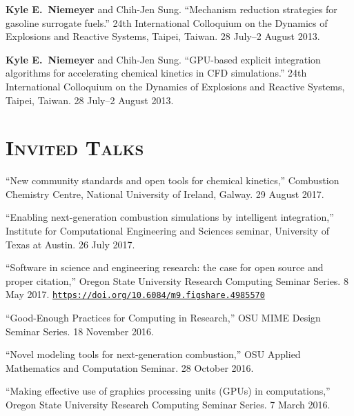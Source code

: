\documentclass[margin,line,11pt]{res}
\makeatletter
\newlength{\bibhang}
\newlength{\bibsep}
 {\@listi \global\bibsep\itemsep \global\advance\bibsep by\parsep}
\newenvironment{bibenum*}
  {\renewcommand\labelenumi{\theenumi.}%
   \etaremune[
     topsep=0pt,
     itemsep=\bibsep,
     parsep=0pt,partopsep=0pt,
     itemindent=-\bibhang,
     leftmargin={\bibhang+\widthof{[999]}}]}
  {\endetaremune}
\newcommand*{\doi}[1]{\href{https://doi.org/#1}{\nolinkurl{https://doi.org/#1}}}
\makeatother
\begin{document}
\begin{resume}
\begin{bibenum*}
\item \textbf{Kyle E.~Niemeyer} and Chih-Jen Sung.
``Mechanism reduction strategies for gasoline surrogate fuels.''
24th International Colloquium on the Dynamics of Explosions and Reactive Systems, Taipei, Taiwan.
28 July--2 August 2013.

\item \textbf{Kyle E.~Niemeyer} and Chih-Jen Sung.
``GPU-based explicit integration algorithms for accelerating chemical kinetics in CFD simulations.''
24th International Colloquium on the Dynamics of Explosions and Reactive Systems, Taipei, Taiwan.
28 July--2 August 2013.

\end{bibenum*}

\section{\textsc{Invited Talks}}

\begin{bibenum*}
\item ``New community standards and open tools for chemical kinetics,''
Combustion Chemistry Centre, National University of Ireland, Galway.
29 August 2017.

\item ``Enabling next-generation combustion simulations by intelligent integration,''
Institute for Computational Engineering and Sciences seminar, University of Texas at Austin.
26 July 2017.

\item ``Software in science and engineering research: the case for open source and proper citation,''
Oregon State University Research Computing Seminar Series. 8 May 2017.
\doi{10.6084/m9.figshare.4985570}

\item ``Good-Enough Practices for Computing in Research,''
OSU MIME Design Seminar Series. 18 November 2016.

\item ``Novel modeling tools for next-generation combustion,''
OSU Applied Mathematics and Computation Seminar. 28 October 2016.

\item ``Making effective use of graphics processing units (GPUs) in computations,''
Oregon State University Research Computing Seminar Series. 7 March 2016.


\end{bibenum*}
\end{resume}
\end{document}

